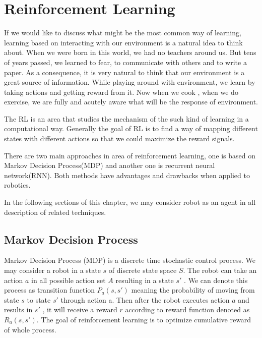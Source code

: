 \documentclass[officiallayout]{tktla}
\begin{document}
\chapter{Reinforcement Learning}

If we would like to discuss what might be the most common way of learning, learning based on interacting with our environment is a natural idea to think about. When we were born in this world, we had no teachers around us. But tens of years passed, we learned to fear, to communicate with others and to write a paper. As a consequence, it is very natural to think that our environment is a great source of information. While playing around with environment, we learn by taking actions and getting reward from it. Now when we cook , when we do exercise, we are fully and acutely aware what will be the response of environment.

The RL is an area that studies the mechanism of the such kind of learning in a computational way. Generally the goal of RL is to find a way of mapping different states with different actions so that we could maximize the reward signals. 

There are two main approaches in area of reinforcement learning, one is based on Markov Decision Process(MDP)\cite{barto1998reinforcement} and another one is recurrent neural network(RNN)\cite{williams1992simple}. Both methods have advantages and drawbacks when applied to robotics.

In the following sections of this chapter, we may consider robot as an agent in all description of related techniques.

\section{Markov Decision Process}
Markov Decision Process (MDP) is a discrete time stochastic control process. We may consider a robot in a state $s$ of discrete state space $S$. The robot can take an action $a$ in all possible action set $A$ resulting in a state $s'$ . We can denote this process as transition function
$P_a(s, s')$ meaning the probability of moving from state
$s$ to state $s'$ through action a. Then after the robot executes action $a$ and results in $s'$ , it will receive a reward $r$ according to reward function denoted as $R_a(s, s ')$. The goal of reinforcement learning is to optimize cumulative reward of whole process. 
\end{document}
